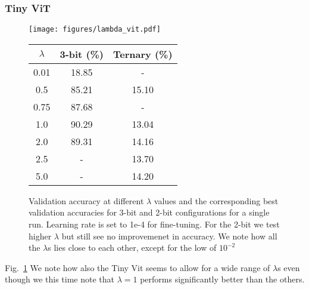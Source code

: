\subsubsection{Tiny ViT}
\begin{figure}[H]
    \centering
    \begin{minipage}{0.50\textwidth}
        \centering
        \texttt{[image: figures/lambda\_vit.pdf]}
    \end{minipage}%
    \hfill
    \begin{minipage}{0.45\textwidth}
        \centering
        \label{tab:best_val_accuracies}
        \begin{tabular}{|c|c|c|}
            \hline
            \textbf{$\lambda$} & \textbf{3-bit (\%)} & \textbf{Ternary (\%)} \\ \hline
            0.01 & 18.85 & - \\ \hline
            0.5  & 85.21 & 15.10 \\ \hline
            0.75 & 87.68 & - \\ \hline
            1.0  & 90.29 & 13.04 \\ \hline
            2.0  & 89.31 & 14.16 \\ \hline
            2.5  & -     & 13.70 \\ \hline
            5.0  & -     & 14.20 \\ \hline
        \end{tabular}
    \end{minipage}
    \caption{Validation accuracy at different $\lambda$ values and the corresponding best validation accuracies for 3-bit and 2-bit configurations for a single run. Learning rate is set to 1e-4 for fine-tuning. For the 2-bit we test higher $\lambda$ but still see no improvemenet in accuracy. We note how all the $\lambda$s lies close to each other, except for the low of $10^{-2}$}
    \label{fig:vit_lambda}
\end{figure}
Fig.~\ref{fig:vit_lambda} We note how also the Tiny Vit seems to allow for a wide range of $\lambda$s even though we this time note that $\lambda=1$ performs significantly better than the others.



